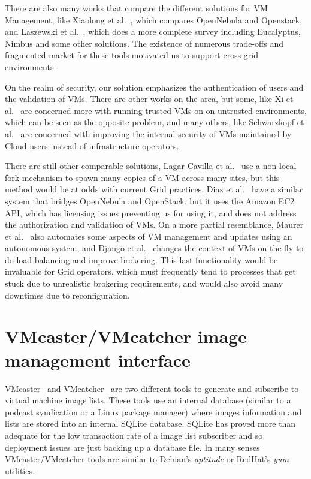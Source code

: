 \documentclass{llncs_Ibergrid2013}
\begin{document}
There are also many works that compare the different solutions for VM Management, like Xiaolong et al.~\cite{Xiaolong2012}, which compares OpenNebula and Openstack, and Laszewski et al.~\cite{Laszewski2012}, which does a more complete survey including Eucalyptus, Nimbus and some other solutions. The existence of numerous trade-offs and fragmented market for these tools motivated us to support cross-grid environments.

On the realm of security, our solution emphasizes the authentication of users and the validation of VMs. There are other works on the area, but some, like Xi et al.~\cite{Xi2012} are concerned more with running trusted VMs on on untrusted environments, which can be seen as the opposite problem, and many others, like Schwarzkopf et al.~\cite{Schwarzkopf2012} are concerned with improving the internal security of VMs maintained by Cloud users instead of infrastructure operators.

There are still other comparable solutions, Lagar-Cavilla et al.~\cite{Lagar-Cavilla2009} use a non-local fork mechanism to spawn many copies of a VM across many sites, but this method would be at odds with current Grid practices. Diaz et al.~\cite{Diaz2012} have a similar system that bridges OpenNebula and OpenStack, but it uses the Amazon EC2 API, which has licensing issues preventing us for using it, and does not address the authorization and validation of VMs. On a more partial resemblance, Maurer et al.~\cite{Maurer2013} also automates some aspects of VM management and updates using an autonomous system, and Django et al.~\cite{Django2013} changes the context of VMs on the fly to do load balancing and improve brokering. This last functionality would be invaluable for Grid operators, which must frequently tend to processes that get stuck due to unrealistic brokering requirements, and would also avoid many downtimes due to reconfiguration.



\section{VMcaster/VMcatcher image management interface}
\label{sect-vmcaster}
VMcaster~\cite{vmcaster} and VMcatcher~\cite{vmcatcher} are two different tools to generate and subscribe to virtual machine image lists.
These tools use an internal database (similar to a podcast syndication or a Linux package manager) where images information and lists are stored into an internal SQLite database.
SQLite has proved more than adequate for the low transaction rate of a image list subscriber and so deployment issues are just backing up a database file.
In many senses VMcaster/VMcatcher tools are similar to Debian's \textit{aptitude} or RedHat's \textit{yum} utilities. 
\end{document}
